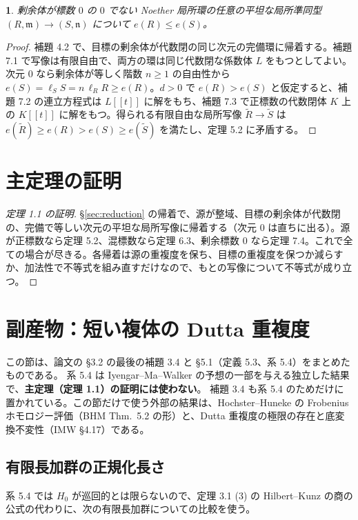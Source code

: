 \documentclass[11pt,a4paper]{ltjsarticle}
\newcommand{\stmtname}{}
\theoremstyle{plain}
\newtheorem*{stmtgen}{\stmtname}
\newenvironment{stmt}[1]{\renewcommand{\stmtname}{#1}\begin{stmtgen}}{\end{stmtgen}}
\theoremstyle{definition}
\newcommand{\m}{\mathfrak{m}}
\newcommand{\n}{\mathfrak{n}}
\begin{document}
\begin{stmt}{定理 7.4}
剰余体が標数 $0$ の $0$ でない Noether 局所環の任意の平坦な局所準同型 $(R,\m)\to(S,\n)$ について $e(R)\le e(S)$。
\end{stmt}
\begin{proof}
補題 4.2 で、目標の剰余体が代数閉の同じ次元の完備環に帰着する。補題 7.1 で写像は有限自由で、両方の環は同じ代数閉な係数体 $L$ をもつとしてよい。次元 $0$ なら剰余体が等しく階数 $n\ge1$ の自由性から $e(S) = \ell_SS = n\,\ell_RR\ge e(R)$。$d>0$ で $e(R)>e(S)$ と仮定すると、補題 7.2 の連立方程式は $L[[t]]$ に解をもち、補題 7.3 で正標数の代数閉体 $K$ 上の $K[[t]]$ に解をもつ。得られる有限自由な局所写像 $\tilde R\to\tilde S$ は $e(\tilde R)\ge e(R)>e(S)\ge e(\tilde S)$ を満たし、定理 5.2 に矛盾する。
\end{proof}

\section{主定理の証明}\label{sec:main}
\begin{proof}[定理 1.1 の証明]
\S\ref{sec:reduction} の帰着で、源が整域、目標の剰余体が代数閉の、完備で等しい次元の平坦な局所写像に帰着する（次元 $0$ は直ちに出る）。源が正標数なら定理 5.2、混標数なら定理 6.3、剰余標数 $0$ なら定理 7.4。これで全ての場合が尽きる。各帰着は源の重複度を保ち、目標の重複度を保つか減らすか、加法性で不等式を組み直すだけなので、もとの写像について不等式が成り立つ。
\end{proof}
\section{副産物：短い複体の Dutta 重複度}\label{sec:dutta}

この節は、論文の \S3.2 の最後の補題 3.4 と \S5.1（定義 5.3、系 5.4）をまとめたものである。
系 5.4 は Iyengar--Ma--Walker の予想の一部を与える独立した結果で、\textbf{主定理（定理 1.1）の証明には使わない}。
補題 3.4 も系 5.4 のためだけに置かれている。この節だけで使う外部の結果は、Hochster--Huneke の Frobenius ホモロジー評価（BHM Thm.~5.2 の形）と、Dutta 重複度の極限の存在と底変換不変性（IMW \S4.17）である。

\subsection{有限長加群の正規化長さ}
系 5.4 では $H_0$ が巡回的とは限らないので、定理 3.1 (3) の Hilbert--Kunz の商の公式の代わりに、次の有限長加群についての比較を使う。
\end{document}
